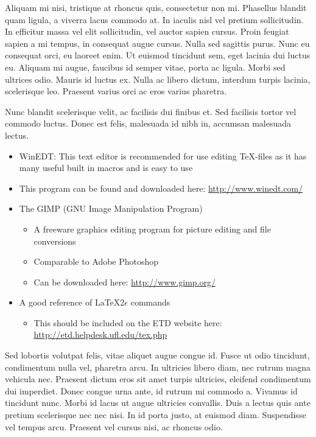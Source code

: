 Aliquam mi nisi, tristique at rhoncus quis, consectetur non mi. Phasellus blandit quam ligula, a viverra lacus commodo at. In iaculis nisl vel pretium sollicitudin. In efficitur massa vel elit sollicitudin, vel auctor sapien cursus. Proin feugiat sapien a mi tempus, in consequat augue cursus. Nulla sed sagittis purus. Nunc eu consequat orci, eu laoreet enim. Ut euismod tincidunt sem, eget lacinia dui luctus eu. Aliquam mi augue, faucibus id semper vitae, porta ac ligula. Morbi sed ultrices odio. Mauris id luctus ex. Nulla ac libero dictum, interdum turpis lacinia, scelerisque leo. Praesent varius orci ac eros varius pharetra.



Nunc blandit scelerisque velit, ac facilisis dui finibus et. Sed facilisis tortor vel commodo luctus. Donec est felis, malesuada id nibh in, accumsan malesuada lectus.
\begin{itemize} %
    \item WinEDT: This text editor is recommended for use editing \TeX-files as it has many useful built in macros and is easy to use  %
    \item This program can be found and downloaded here: \url{http://www.winedt.com/} %
    \item The GIMP (GNU Image Manipulation Program) %
    \begin{itemize}%
        \item A freeware graphics editing program for picture editing and file conversions %
        \item Comparable to Adobe Photoshop %
        \item Can be downloaded here: \url{http://www.gimp.org/}%
    \end{itemize}
    \item A good reference of \LaTeX 2\ensuremath{\epsilon} commands%
    \begin{itemize}
        \item This should be included on the ETD website here: \url{http://etd.helpdesk.ufl.edu/tex.php}
    \end{itemize}
\end{itemize} %


Sed lobortis volutpat felis, vitae aliquet augue congue id. Fusce ut odio tincidunt, condimentum nulla vel, pharetra arcu. In ultricies libero diam, nec rutrum magna vehicula nec. Praesent dictum eros sit amet turpis ultricies, eleifend condimentum dui imperdiet. Donec congue urna ante, id rutrum mi commodo a. Vivamus id tincidunt nunc. Morbi id lacus ut augue ultricies convallis. Duis a lectus quis ante pretium scelerisque nec nec nisi. In id porta justo, at euismod diam. Suspendisse vel tempus arcu. Praesent vel cursus nisi, ac rhoncus odio.

